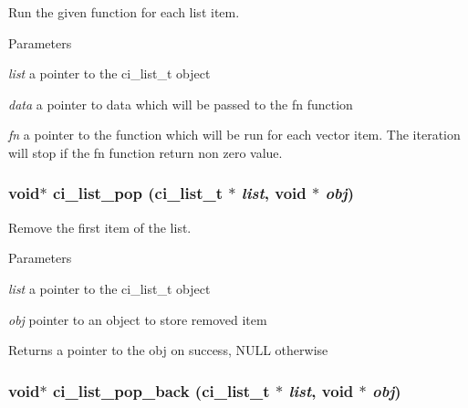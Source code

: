 Run the given function for each list item. 
\begin{DoxyParams}{Parameters}
\item[{\em list}]a pointer to the ci\_\-list\_\-t object \item[{\em data}]a pointer to data which will be passed to the fn function \item[{\em fn}]a pointer to the function which will be run for each vector item. The iteration will stop if the fn function return non zero value. \end{DoxyParams}
\hypertarget{group__LISTS_gaa508f38d5d4ac019dbc7acbb6ad58e5a}{
\subsubsection[{ci\_\-list\_\-pop}]{\setlength{\rightskip}{0pt plus 5cm}void$\ast$ ci\_\-list\_\-pop ({\bf ci\_\-list\_\-t} $\ast$ {\em list}, \/  void $\ast$ {\em obj})}}
\label{group__LISTS_gaa508f38d5d4ac019dbc7acbb6ad58e5a}


Remove the first item of the list. 
\begin{DoxyParams}{Parameters}
\item[{\em list}]a pointer to the ci\_\-list\_\-t object \item[{\em obj}]pointer to an object to store removed item \end{DoxyParams}
\begin{DoxyReturn}{Returns}
a pointer to the obj on success, NULL otherwise 
\end{DoxyReturn}
\hypertarget{group__LISTS_ga522334a836ba93ab88cc9df691a59d4c}{
\subsubsection[{ci\_\-list\_\-pop\_\-back}]{\setlength{\rightskip}{0pt plus 5cm}void$\ast$ ci\_\-list\_\-pop\_\-back ({\bf ci\_\-list\_\-t} $\ast$ {\em list}, \/  void $\ast$ {\em obj})}}
\label{group__LISTS_ga522334a836ba93ab88cc9df691a59d4c}


